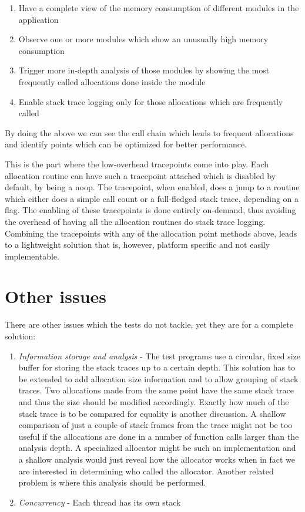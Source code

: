 \begin{enumerate}
\item Have a complete view of the memory consumption of different modules in the application
\item Observe one or more modules which show an unusually high memory consumption
\item Trigger more in-depth analysis of those modules by showing the most frequently called allocations done inside the module
\item Enable stack trace logging only for those allocations which are frequently called
\end{enumerate}

By doing the above we can see the call chain which leads to frequent allocations and identify points which can be optimized for better performance.

This is the part where the low-overhead tracepoints come into play. Each allocation routine can have such a tracepoint attached which is disabled by default, by being a noop. The tracepoint, when enabled, does a jump to a routine which either does a simple call count or a full-fledged stack trace, depending on a flag. The enabling of these tracepoints is done entirely on-demand, thus avoiding the overhead of having all the allocation routines do stack trace logging. Combining the tracepoints with any of the allocation point methods above, leads to a lightweight solution that is, however, platform specific and not easily implementable.

\section{Other issues}
\label{section:otherissues}

There are other issues which the tests do not tackle, yet they are for a complete solution:
\begin{enumerate}
\item \textit{Information storage and analysis} - The test programs use a circular, fixed size buffer for storing the stack traces up to a certain depth. This solution has to be extended to add allocation size information and to allow grouping of stack traces. Two allocations made from the same point have the same stack trace and thus the size should be modified accordingly. Exactly how much of the stack trace is to be compared for equality is another discussion. A shallow comparison of just a couple of stack frames from the trace might not be too useful if the allocations are done in a number of function calls larger than the analysis depth. A specialized allocator might be such an implementation and a shallow analysis would just reveal how the allocator works when in fact we are interested in determining who called the allocator. Another related problem is where this analysis should be performed.
\item \textit{Concurrency} - Each thread has its own stack
\end{enumerate}

